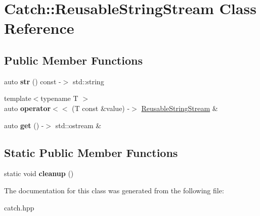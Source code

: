 \hypertarget{classCatch_1_1ReusableStringStream}{}\section{Catch\+:\+:Reusable\+String\+Stream Class Reference}
\label{classCatch_1_1ReusableStringStream}
\subsection*{Public Member Functions}
\begin{DoxyCompactItemize}
\item 
auto {\bfseries str} () const -\/$>$ std\+::string\hypertarget{classCatch_1_1ReusableStringStream_a0e9ecf260b2a5d35f4886ef0d51f6270}{}\label{classCatch_1_1ReusableStringStream_a0e9ecf260b2a5d35f4886ef0d51f6270}

\item 
{\footnotesize template$<$typename T $>$ }\\auto {\bfseries operator$<$$<$} (T const \&value) -\/$>$ \hyperlink{classCatch_1_1ReusableStringStream}{Reusable\+String\+Stream} \&\hypertarget{classCatch_1_1ReusableStringStream_af95f72024c082db70e5e50782e28e4f6}{}\label{classCatch_1_1ReusableStringStream_af95f72024c082db70e5e50782e28e4f6}

\item 
auto {\bfseries get} () -\/$>$ std\+::ostream \&\hypertarget{classCatch_1_1ReusableStringStream_a6881808c60a080d4e24a0b81c94cbf67}{}\label{classCatch_1_1ReusableStringStream_a6881808c60a080d4e24a0b81c94cbf67}

\end{DoxyCompactItemize}
\subsection*{Static Public Member Functions}
\begin{DoxyCompactItemize}
\item 
static void {\bfseries cleanup} ()\hypertarget{classCatch_1_1ReusableStringStream_a4c320cf5ece009ed23c55b1fa9afccde}{}\label{classCatch_1_1ReusableStringStream_a4c320cf5ece009ed23c55b1fa9afccde}

\end{DoxyCompactItemize}


The documentation for this class was generated from the following file\+:\begin{DoxyCompactItemize}
\item 
catch.\+hpp\end{DoxyCompactItemize}
